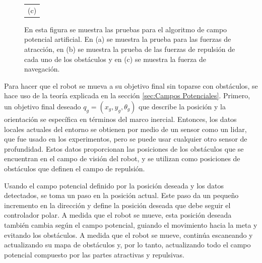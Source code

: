 \begin{figure}
\begin{tabular}{cc}
    \multicolumn{2}{c}{(c)}
  \end{tabular}
  \captionsetup{font=footnotesize}
    \caption{\label{f:APF}En esta figura se muestra las pruebas para el algoritmo de campo potencial 
    artificial. En (a) se muestra la prueba para las fuerzas de atracción, en (b) se muestra la
    prueba de las fuerzas de repulsión de cada uno de los obstáculos y en (c) se muestra la fuerza
    de navegación.}
\end{figure}
Para hacer que el robot se mueva a su objetivo final sin toparse con obstáculos, se 
hace uso de la teoría explicada en la sección \ref{sec:Campos Potenciales}. Primero, un 
objetivo final deseado $q_{g} =(x_{g}, y_{g}, \theta_{g})$ que describe la posición y la 
orientación se específica en términos del marco inercial. Entonces, los datos locales 
actuales del entorno se obtienen por medio de un sensor como un lidar, que fue usado en 
los experimentos, pero se puede usar cualquier otro sensor de profundidad. Estos datos 
proporcionan las posiciones de los obstáculos que se encuentran en el campo de visión del 
robot, y se utilizan como posiciones de obstáculos que definen el campo de repulsión. 

Usando el campo potencial definido por la posición deseada y los datos detectados, se toma un 
paso en la posición actual. Este paso da un pequeño incremento en la dirección y define la 
posición deseada que debe seguir el controlador polar. A medida que el robot se mueve, esta 
posición deseada también cambia según el campo potencial, guiando el movimiento hacia la meta 
y evitando los obstáculos. A medida que el robot se mueve, continúa escaneando y actualizando 
su mapa de obstáculos y, por lo tanto, actualizando todo el campo potencial compuesto por las 
partes atractivas y repulsivas.

